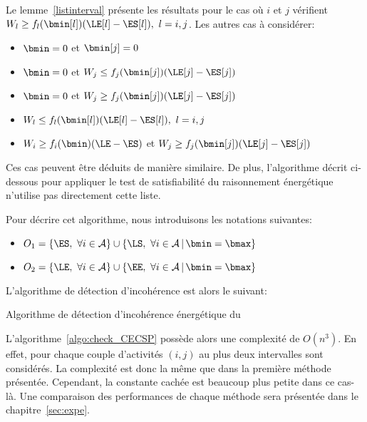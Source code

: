 Le lemme~\ref{listinterval} présente les résultats pour le cas où $i$
et $j$ vérifient $W_l\ge f_l(\bmin[l])(\LE[l]-\ES[l]),\ l=i,j$. Les autres
cas à considérer:
\begin{itemize}
\item $\bmin=0$ et $\bmin[j]=0$
\item $\bmin=0$ et $W_j\le f_j(\bmin[j])(\LE[j]-\ES[j])$
\item $\bmin=0$ et $W_j\ge f_j(\bmin[j])(\LE[j]-\ES[j])$
\item $W_l\le f_l(\bmin[l])(\LE[l]-\ES[l]),\ l=i,j$
\item $W_i\ge f_i(\bmin)(\LE-\ES)$ et $W_j\ge
f_j(\bmin[j])(\LE[j]-\ES[j])$
\end{itemize} 
Ces cas peuvent être déduits de manière similaire. De plus,
l'algorithme décrit ci-dessous pour appliquer le test de
satisfiabilité du raisonnement énergétique n'utilise pas directement
cette liste.

Pour décrire cet algorithme, nous introduisons les notations
suivantes: 
\begin{itemize}
\item $O_1=\{\ES ,\ \forall i \in \A\} \cup \{\LS ,\ \forall i \in \A \, |\,
  \bmin = \bmax \} $
\item $O_2=\{\LE ,\ \forall i \in \A\} \cup \{\EE ,\ \forall i \in \A \, |\,
  \bmin = \bmax \}$
\end{itemize}

L'algorithme de détection d'incohérence est alors le suivant:
\begin{algorithm}[!htb]
  \caption{Algorithme de détection d'incohérence énergétique du \CECSP}
  \label{algo:check_CECSP}
\end{algorithm}

L'algorithme~\ref{algo:check_CECSP} possède alors une complexité de
$O(n^3)$. En effet, pour chaque couple d'activités $(i,j)$ au plus
deux intervalles sont considérés. La complexité est donc la même que
dans la première méthode présentée. Cependant, la constante cachée est
beaucoup plus petite dans ce cas-là. Une comparaison des performances
de chaque méthode sera présentée dans le chapitre~\ref{sec:expe}.

